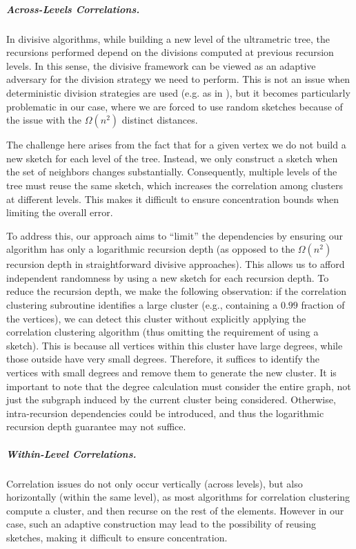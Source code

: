 \documentclass{article}
\begin{document}
\subparagraph*{Across-Levels Correlations.} In divisive algorithms, while building a new level of the ultrametric tree, the recursions performed depend on the divisions computed at previous recursion levels.
In this sense, the divisive framework can be viewed as an adaptive adversary for the division strategy we need to perform.
This is not an issue when deterministic division strategies are used (e.g. as in \cite{cohen2022fitting}), but it becomes particularly problematic in our case, where we are forced to use random sketches because of the issue with the $\Omega(n^2)$ distinct distances.

The challenge here arises from the fact that for a given vertex we do not build a new sketch for each level of the tree. Instead, we only construct a sketch when the set of neighbors changes substantially. Consequently, multiple levels of the tree must reuse the same sketch, which increases the correlation among clusters at different levels. This makes it difficult to ensure concentration bounds when limiting the overall error.

To address this, our approach aims to ``limit'' the dependencies by ensuring our algorithm has only a logarithmic recursion depth (as opposed to the \(\Omega(n^2)\) recursion depth in straightforward divisive approaches). This allows us to afford independent randomness by using a new sketch for each recursion depth.
To reduce the recursion depth, we make the following observation: if the correlation clustering subroutine identifies a large cluster (e.g., containing a $0.99$ fraction of the vertices), we can detect this cluster without explicitly applying the correlation clustering algorithm (thus omitting the requirement of using a sketch). This is because all vertices within this cluster have large degrees, while those outside have very small degrees. Therefore, it suffices to identify the vertices with small degrees and remove them to generate the new cluster.
It is important to note that the degree calculation must consider the entire graph, not just the subgraph induced by the current cluster being considered. Otherwise, intra-recursion dependencies could be introduced, and thus the logarithmic recursion depth guarantee may not suffice.


\subparagraph*{Within-Level Correlations.} Correlation issues do not only occur vertically (across levels), but also horizontally (within the same level), as most algorithms for correlation clustering compute a cluster, and then recurse on the rest of the elements.
However in our case, such an adaptive construction may lead to the possibility of reusing sketches, making it difficult to ensure concentration.
\end{document}
